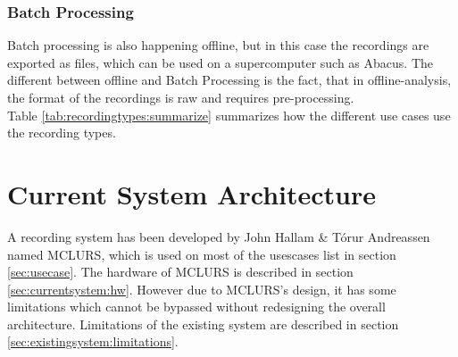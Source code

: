\subsubsection{Batch Processing}
Batch processing is also happening offline, but in this case the recordings are exported as  files, which can be used on a supercomputer such as Abacus. The different between offline and Batch Processing is the fact, that in offline-analysis, the format of the recordings is raw and requires pre-processing.\\

Table \ref{tab:recordingtypes:summarize} summarizes how the different use cases use the recording types.

\begin{table}[!h]
\centering
{}
\caption{Table that summarizes the uses cases with the type of recording and analysis they use}
\label{tab:recordingtypes:summarize}
\end{table}

\section{Current System Architecture}

A recording system has been developed by John Hallam \& T{\'o}rur Andreassen \citep{andreassen2013ultrasonic} named \ac{MCLURS}, which is used on most of the usescases list in section \ref{sec:usecase}. The hardware of MCLURS is described in section \ref{sec:currentsystem:hw}. 
However due to MCLURS's design, it has some limitations which cannot be bypassed without redesigning the overall architecture. Limitations of the existing system are described in section \ref{sec:existingsystem:limitations}.\\


